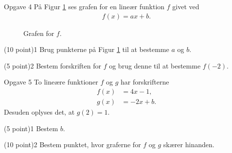 \begin{opgavetekst}{Opgave 4}
	På Figur \ref{fig:oneline2} ses grafen for en lineær funktion $f$ givet ved
	\begin{align*}
		f(x) = ax + b.
	\end{align*}
	\begin{figure}[H]
		\centering
		\caption{Grafen for $f$.}
		\label{fig:oneline2}
	\end{figure}\phantom{h}
\end{opgavetekst}
\begin{delopgave}{(10 point)}{1}
	Brug punkterne på Figur \ref{fig:oneline2} til at bestemme $a$ og $b$. 
\end{delopgave}
\begin{delopgave}{(5 point)}{2}
	Bestem forskriften for $f$ og brug denne til at bestemme $f(-2)$. 
\end{delopgave}

\begin{opgavetekst}{Opgave 5}
	To lineære funktioner $f$ og $g$ har forskrifterne
	\begin{align*}
		f(x) &= 4x-1,\\
		g(x) &= -2x+b.	
	\end{align*}	
	Desuden oplyses det, at $g(2) = 1$.
\end{opgavetekst}
\begin{delopgave}{(5 point)}{1}
	Bestem $b$.
\end{delopgave}
\begin{delopgave}{(10 point)}{2}
	Bestem punktet, hvor graferne for $f$ og $g$ skærer hinanden. 
\end{delopgave}


